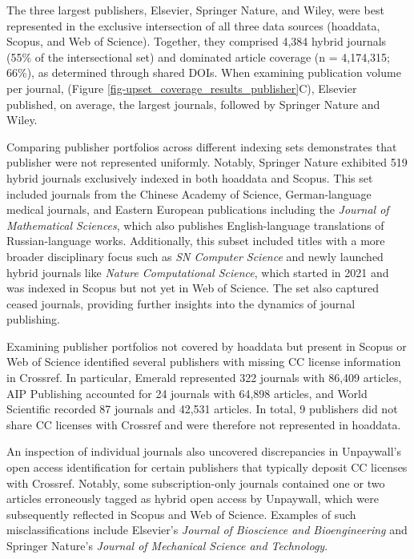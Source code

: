 \documentclass[a4paper,man,floatsintext,longtable,noextraspace,10pt]{apa6}
\begin{document}
The three largest publishers, Elsevier, Springer Nature, and Wiley, were
best represented in the exclusive intersection of all three data sources
(hoaddata, Scopus, and Web of Science). Together, they comprised 4,384
hybrid journals (55\% of the intersectional set) and dominated article
coverage (n = 4,174,315; 66\%), as determined through shared DOIs. When
examining publication volume per journal, (Figure
\ref{fig-upset_coverage_results_publisher}C), Elsevier published, on
average, the largest journals, followed by Springer Nature and Wiley.

Comparing publisher portfolios across different indexing sets
demonstrates that publisher were not represented uniformly. Notably,
Springer Nature exhibited 519 hybrid journals exclusively indexed in
both hoaddata and Scopus. This set included journals from the Chinese
Academy of Science, German-language medical journals, and Eastern
European publications including the \emph{Journal of Mathematical
Sciences}, which also publishes English-language translations of
Russian-language works. Additionally, this subset included titles with a
more broader disciplinary focus such as \emph{SN Computer Science} and
newly launched hybrid journals like \emph{Nature Computational Science},
which started in 2021 and was indexed in Scopus but not yet in Web of
Science. The set also captured ceased journals, providing further
insights into the dynamics of journal publishing.

Examining publisher portfolios not covered by hoaddata but present in
Scopus or Web of Science identified several publishers with missing CC
license information in Crossref. In particular, Emerald represented 322
journals with 86,409 articles, AIP Publishing accounted for 24 journals
with 64,898 articles, and World Scientific recorded 87 journals and
42,531 articles. In total, 9 publishers did not share CC licenses with
Crossref and were therefore not represented in hoaddata.

An inspection of individual journals also uncovered discrepancies in
Unpaywall's open access identification for certain publishers that
typically deposit CC licenses with Crossref. Notably, some
subscription-only journals contained one or two articles erroneously
tagged as hybrid open access by Unpaywall, which were subsequently
reflected in Scopus and Web of Science. Examples of such
misclassifications include Elsevier's \emph{Journal of Bioscience and
Bioengineering} and Springer Nature's \emph{Journal of Mechanical
Science and Technology}.
\end{document}
